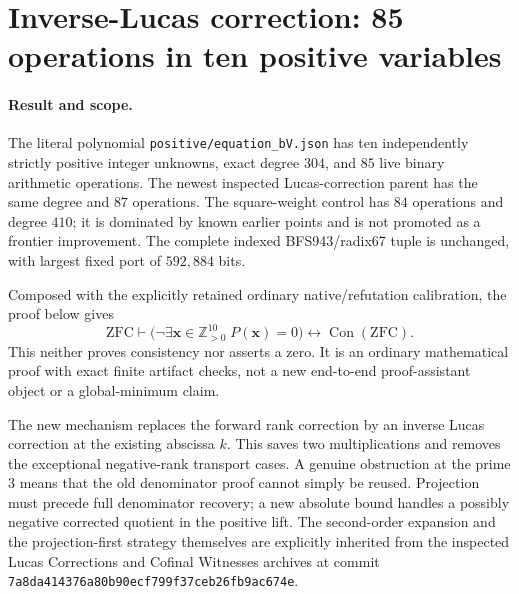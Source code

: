 \section{Inverse-Lucas correction: 85 operations in ten positive variables}
\label{sec:inverse-lucas}

\paragraph{Result and scope.}
The literal polynomial \texttt{positive/equation\_bV.json} has ten
independently strictly positive integer unknowns, exact degree \(304\),
and \(85\) live binary arithmetic operations.  The newest inspected
Lucas-correction parent has the same degree and \(87\) operations.
The square-weight control has \(84\) operations and degree \(410\);
it is dominated by known earlier points and is not promoted as a frontier
improvement.  The complete indexed BFS943/radix67 tuple is unchanged,
with largest fixed port of \(592{,}884\) bits.

Composed with the explicitly retained ordinary native/refutation
calibration, the proof below gives
\[
 \mathrm{ZFC}\vdash
 \bigl(\neg\exists\boldsymbol{x}\in\mathbb Z_{>0}^{10}\;
 P(\boldsymbol{x})=0\bigr)\longleftrightarrow\operatorname{Con}(\mathrm{ZFC}).
\]
This neither proves consistency nor asserts a zero.  It is an ordinary
mathematical proof with exact finite artifact checks, not a new end-to-end
proof-assistant object or a global-minimum claim.

The new mechanism replaces the forward rank correction by an inverse
Lucas correction at the existing abscissa \(k\).  This saves two
multiplications and removes the exceptional negative-rank transport cases.
A genuine obstruction at the prime \(3\) means that the old denominator
proof cannot simply be reused.  Projection must precede full denominator
recovery; a new absolute bound handles a possibly negative corrected quotient
in the positive lift.  The second-order expansion and the projection-first
strategy themselves are explicitly inherited from the inspected Lucas
Corrections and Cofinal Witnesses archives at commit
\texttt{7a8da414376a80b90ecf799f37ceb26fb9ac674e}.

